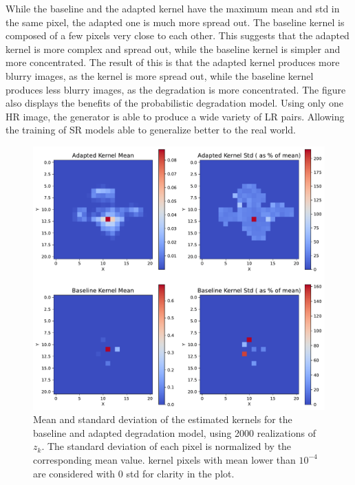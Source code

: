         While the baseline and the adapted kernel have the maximum mean and std in the same pixel, the adapted one is much more spread out. 
        The baseline kernel is composed of a few pixels very close to each other.
        This suggests that the adapted kernel is more complex and spread out, while the baseline kernel is simpler and more concentrated.
        The result of this is that the adapted kernel produces more blurry images, as the kernel is more spread out, while the baseline kernel produces less blurry images, as the degradation is more concentrated.
        The figure also displays the benefits of the probabilistic degradation model.
        Using only one HR image, the generator is able to produce a wide variety of LR pairs. Allowing the training of SR models able to generalize better to the real world.

        \begin{figure}[H]
            \centering
            \includegraphics[width=\textwidth]{Includes/5-source-kernel-mean-std.pdf}
            \caption{Mean and standard deviation of the estimated kernels for the baseline and adapted degradation model, using 2000 realizations of $z_k$.
                     The standard deviation of each pixel is normalized by the corresponding mean value.
                     kernel pixels with mean lower than $10^{-4}$ are considered with 0 std for clarity in the plot.}
            \label{fig:5-source-kernel-mean-std}
        \end{figure}

